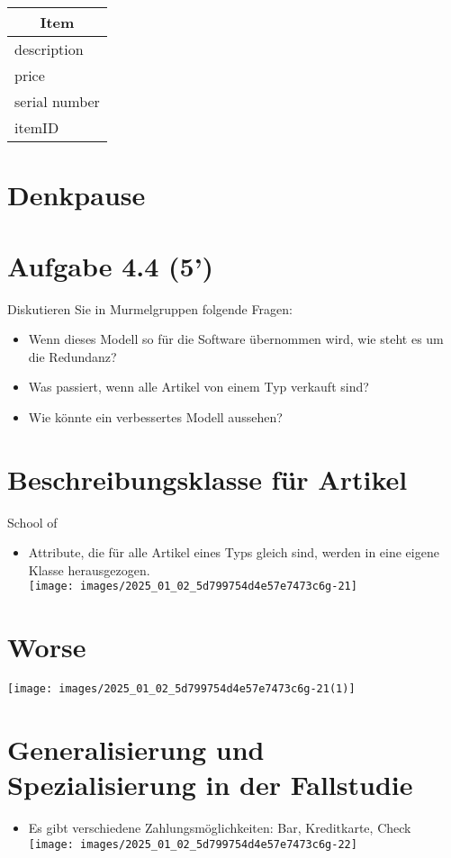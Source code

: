 \documentclass[10pt]{article}
\begin{document}
\begin{center}
\begin{tabular}{|l|}
\hline
\multicolumn{1}{|c|}{Item} \\
\hline
description \\
price \\
serial number \\
itemID \\
\hline
\end{tabular}
\end{center}

\section*{Denkpause}
\section*{Aufgabe 4.4 (5’)}
Diskutieren Sie in Murmelgruppen folgende Fragen:

\begin{itemize}
  \item Wenn dieses Modell so für die Software übernommen wird, wie steht es um die Redundanz?
  \item Was passiert, wenn alle Artikel von einem Typ verkauft sind?
  \item Wie könnte ein verbessertes Modell aussehen?
\end{itemize}

\section*{Beschreibungsklasse für Artikel}
School of

\begin{itemize}
  \item Attribute, die für alle Artikel eines Typs gleich sind, werden in eine eigene Klasse herausgezogen.\\
\texttt{[image: images/2025\_01\_02\_5d799754d4e57e7473c6g-21]}
\end{itemize}

\section*{Worse}
\begin{center}
\texttt{[image: images/2025\_01\_02\_5d799754d4e57e7473c6g-21(1)]}
\end{center}

\section*{Generalisierung und Spezialisierung in der Fallstudie}
\begin{itemize}
  \item Es gibt verschiedene Zahlungsmöglichkeiten: Bar, Kreditkarte, Check\\
\texttt{[image: images/2025\_01\_02\_5d799754d4e57e7473c6g-22]}
\end{itemize}
\end{document}
